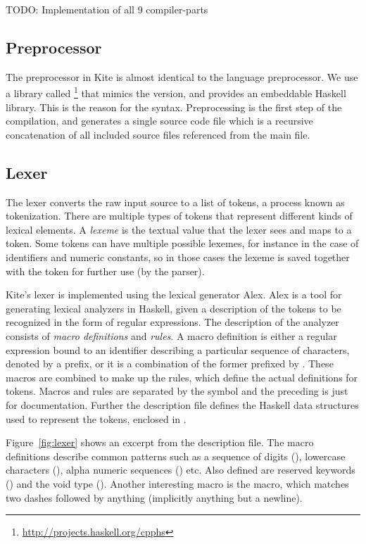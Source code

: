 TODO: Implementation of all 9 compiler-parts


\subsection{Preprocessor}

The preprocessor in Kite is almost identical to the  language preprocessor. We use a library called \footnote{\url{http://projects.haskell.org/cpphs}} that mimics the  version, and provides an embeddable Haskell library. This is the reason for the  syntax. Preprocessing is the first step of the compilation, and generates a single source code file which is a recursive concatenation of all included source files referenced from the main file.

\subsection{Lexer}
\label{sec:impl-lexer}
The lexer converts the raw input source to a list of tokens, a process known as tokenization. There are multiple types of tokens that represent different kinds of lexical elements. A \emph{lexeme} is the textual value that the lexer sees and maps to a token. Some tokens can have multiple possible lexemes, for instance in the case of identifiers and numeric constants, so in those cases the lexeme is saved together with the token for further use (by the parser).

Kite's lexer is implemented using the lexical generator Alex. Alex is a tool for generating lexical analyzers in Haskell, given a description of the tokens to be recognized in the form of regular expressions\cite[p. 4]{dornan01}. The description of the analyzer consists of \emph{macro definitions} and \emph{rules}. A macro definition is either a regular expression bound to an identifier describing a particular sequence of characters, denoted by a \code{\$} prefix, or it is a combination of the former prefixed by . These macros are combined to make up the rules, which define the actual definitions for tokens. Macros and rules are separated by the symbol \code{:-} and the preceding  is just for documentation\cite[p. 7]{dornan01}. Further the description file defines the Haskell data structures used to represent the tokens, enclosed in \code{\{ \}}.

Figure~\ref{fig:lexer} shows an excerpt from the description file. The macro definitions describe common patterns such as a sequence of digits (), lowercase characters (), alpha numeric sequences () etc. Also defined are reserved keywords (\code{\@keywords}) and the void type (). Another interesting macro is the  macro, which matches two dashes followed by anything (implicitly anything but a newline).

